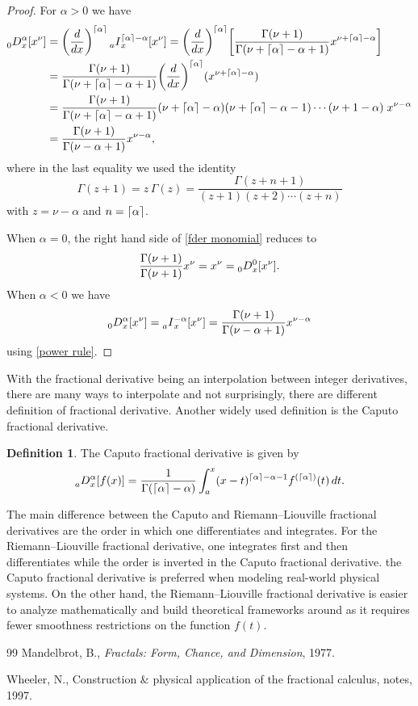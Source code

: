 \documentclass[12pt]{article}
\DeclarePairedDelimiter{\ceil}{\lceil}{\rceil}
\theoremstyle{definition}
\newtheorem{definition}{Definition}
\newcommand{\D}[2]{\prescript{}{#1}{D}_x^{#2}}
\newcommand{\I}[2]{\prescript{}{#1}{I}_x^{#2}}
\begin{document}
\begin{proof}
For $\alpha > 0$ we have
\begin{align*}
\D{0}{\alpha}[x^\nu] &= \bigg(\dfrac{d}{dx}\bigg)^{\ceil{\alpha}} \I{a}{\ceil{\alpha}-\alpha} [x^\nu] = \bigg(\dfrac{d}{dx}\bigg)^{\ceil{\alpha}}\bigg[\frac{\Gamma(\nu+1)}{\Gamma(\nu+ \ceil{\alpha}-\alpha+1)} x^{\nu+\ceil{\alpha}-\alpha}\bigg] \\
&= \frac{\Gamma(\nu+1)}{\Gamma(\nu+ \ceil{\alpha}-\alpha+1)} \bigg(\dfrac{d}{dx}\bigg)^{\ceil{\alpha}}(x^{\nu+\ceil{\alpha}-\alpha}) \\
&= \frac{\Gamma(\nu+1)}{\Gamma(\nu+ \ceil{\alpha}-\alpha+1)} (\nu+\ceil{\alpha}-\alpha)(\nu+\ceil{\alpha}-\alpha-1)\cdots(\nu+1-\alpha)\; x^{\nu-\alpha}\\
&= \frac{\Gamma(\nu+1)}{\Gamma(\nu-\alpha+1)} x^{\nu-\alpha},
\end{align*}
where in the last equality we used the identity
\[
\Gamma(z+1) = z\, \Gamma(z) = \frac{\Gamma(z+n+1)}{(z+1)(z+2)\cdots(z+n)}
\]
with $z=\nu-\alpha$ and $n = \ceil{\alpha}$.

When $\alpha=0$, the right hand side of \eqref{fder monomial} reduces to
\[
\frac{\Gamma(\nu+1)}{\Gamma(\nu + 1)} x^{\nu} = x^\nu = \D{0}{0}[x^\nu].
\]
When $\alpha<0$ we have
\[
\D{0}{\alpha}[x^\nu] = \I{a}{-\alpha}[x^\nu] = \frac{\Gamma(\nu+1)}{\Gamma(\nu-\alpha+1)} x^{\nu-\alpha}
\]
using \eqref{power rule}.
\end{proof}

With the fractional derivative being an interpolation between integer derivatives, there are many ways to interpolate and not surprisingly, there are different definition of fractional derivative.  Another widely used definition is the Caputo fractional derivative.

\begin{definition}
The Caputo fractional derivative is given by
\[
\D{a}{\alpha}[f(x)] = \frac{1}{\Gamma(\ceil{\alpha}-\alpha)}\int_a^x(x-t)^{\ceil{\alpha}-\alpha-1}f^{(\ceil{\alpha})}(t)\, dt.
\]
\end{definition}

The main difference between the Caputo and Riemann--Liouville fractional derivatives are the order in which one differentiates and integrates.  For the Riemann--Liouville fractional derivative, one integrates first and then differentiates while the order is inverted in the Caputo fractional derivative. the Caputo fractional derivative is preferred when modeling real-world physical systems.  On the other hand, the Riemann--Liouville fractional derivative is easier to analyze mathematically and build theoretical frameworks around as it requires fewer smoothness restrictions on the function $f(t)$.



\begin{thebibliography}{99}
Mandelbrot, B., {\it Fractals: Form, Chance, and Dimension}, 1977.

Wheeler, N., Construction \& physical application of the fractional calculus, notes, 1997.
\end{thebibliography}
\end{document}
